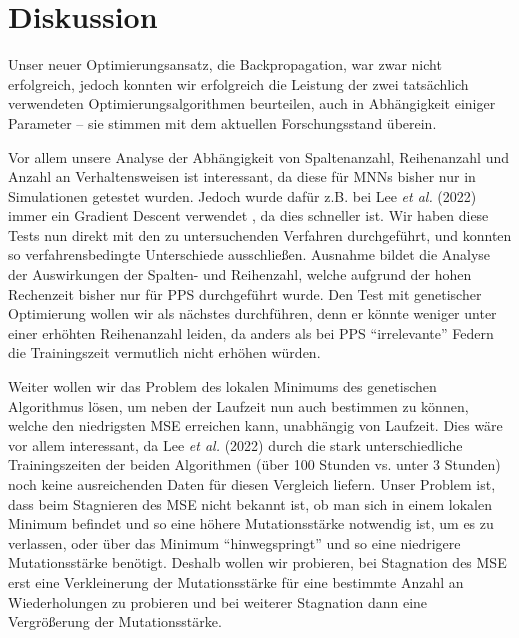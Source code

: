 \documentclass[10pt]{scrartcl}
\newcommand{\lee}{Lee {\itshape et al.} (2022)}
\begin{document}
\section{Diskussion}

Unser neuer Optimierungsansatz, die Backpropagation, war zwar nicht erfolgreich, jedoch konnten wir erfolgreich die Leistung der zwei tatsächlich verwendeten Optimierungsalgorithmen beurteilen, auch in Abhängigkeit einiger Parameter -- sie stimmen mit dem aktuellen Forschungsstand überein.

Vor allem unsere Analyse der Abhängigkeit von Spaltenanzahl, Reihenanzahl und Anzahl an Verhaltensweisen ist interessant, da diese für MNNs bisher nur in Simulationen getestet wurden.
Jedoch wurde dafür z.B. bei \lee{} immer ein Gradient Descent verwendet \cite[6]{Lee2022Sup}, da dies schneller ist.
Wir haben diese Tests nun direkt mit den zu untersuchenden Verfahren durchgeführt, und konnten so verfahrensbedingte Unterschiede ausschließen.
Ausnahme bildet die Analyse der Auswirkungen der Spalten- und Reihenzahl, welche aufgrund der hohen Rechenzeit bisher nur für PPS durchgeführt wurde.
Den Test mit genetischer Optimierung wollen wir als nächstes durchführen, denn er könnte weniger unter einer erhöhten Reihenanzahl leiden, da anders als bei PPS \enquote{irrelevante} Federn die Trainingszeit vermutlich nicht erhöhen würden.

Weiter wollen wir das Problem des lokalen Minimums des genetischen Algorithmus lösen, um neben der Laufzeit nun auch bestimmen zu können, welche den niedrigsten MSE erreichen kann, unabhängig von Laufzeit.
Dies wäre vor allem interessant, da \lee{} durch die stark unterschiedliche Trainingszeiten der beiden Algorithmen (über 100 Stunden vs. unter 3 Stunden) noch keine ausreichenden Daten für diesen Vergleich liefern. 
Unser Problem ist, dass beim Stagnieren des MSE nicht bekannt ist, ob man sich in einem lokalen Minimum befindet und so eine höhere Mutationsstärke notwendig ist, um es zu verlassen, oder über das Minimum \enquote{hinwegspringt} und so eine niedrigere Mutationsstärke benötigt.
Deshalb wollen wir probieren, bei Stagnation des MSE erst eine Verkleinerung der Mutationsstärke für eine bestimmte Anzahl an Wiederholungen zu probieren und bei weiterer Stagnation dann eine Vergrößerung der Mutationsstärke.
\end{document}
